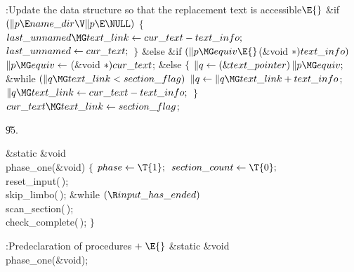 \B{}:Update the data structure so that the replacement text is
accessible\X${}\E{}$\6
\&{if} ${}(\|p\E\\{name\_dir}\V\|p\E\NULL){}$\5
${}\{{}$\1\6
${}\\{last\_unnamed}\MG\\{text\_link}\K\\{cur\_text}-\\{text\_info};{}$\6
${}\\{last\_unnamed}\leftarrow\\{cur\_text};{}$\6
\4${}\}{}$\2\6
\&{else} \&{if} ${}(\|p\MG\\{equiv}\E{}$(\&{void} ${}{*})\,\\{text\_info}){}$\1%
\5
${}\|p\MG\\{equiv}\K{}$(\&{void} ${}{*})\,\\{cur\_text}{}$;\2\6
\&{else}\5
${}\{{}$\1\6
${}\|q\K(\&{text\_pointer})\,\|p\MG\\{equiv};{}$\6
\&{while} ${}(\|q\MG\\{text\_link}<\\{section\_flag}){}$\1\5
${}\|q\K\|q\MG\\{text\_link}+\\{text\_info}{}$;\2\6
${}\|q\MG\\{text\_link}\K\\{cur\_text}-\\{text\_info};{}$\6
\4${}\}{}$\2\6
${}\\{cur\_text}\MG\\{text\_link}\K\\{section\_flag}{}$;\par
\U95.\fi

\B\1\1\&{static} \&{void} \\{phase\_one}(\&{void})\2\2\6
${}\{{}$\1\6
${}\\{phase}\K\T{1};{}$\6
${}\\{section\_count}\K\T{0};{}$\6
\\{reset\_input}(\,);\6
\\{skip\_limbo}(\,);\6
\&{while} ${}(\R\\{input\_has\_ended}){}$\1\5
\\{scan\_section}(\,);\2\6
\\{check\_complete}(\,);\6
\4${}\}{}$\2\par
\fi

\B{}:Predeclaration of procedures\X${}\mathrel+\E{}$\5
\&{static} \&{void} \\{phase\_one}(\&{void});\par
\fi

